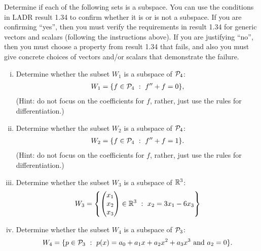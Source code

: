 \begin{question}
    \normalfont

    Determine if each of the following sets is a subspace.  You can use the conditions in LADR result 1.34 to confirm whether it is or is not a subspace.  If you are confirming ``yes'', then you must verify the requirements in result 1.34 for generic vectors and scalars (following the instructions above).  If you are justifying ``no'', then you must choose a property from result 1.34 that fails, and also you must give concrete choices of vectors and/or scalars that demonstrate the failure.


    \begin{enumerate}[(i)]
        \item Determine whether the subset $W_1$ is a subspace of $\P_4$:
              \begin{align*}
                  W_1=\{ f\in \P_4\ : \ f''+f=0 \},
              \end{align*}
              (Hint: do not focus on the coefficients for $f$, rather, just use the rules for differentiation.)

              \vspace{.6cm}

        \item Determine whether the subset $W_2$  is a subspace of $\P_4$:
              \begin{align*}
                  W_2=\{ f\in \P_4\ : \ f''+f=1 \}.
              \end{align*}
              (Hint: do not focus on the coefficients for $f$, rather, just use the rules for differentiation.)

              \vspace{.6cm}


        \item  Determine whether the subset $W_3$ is a subspace of $\real^3$:
              \begin{align*}
                  W_3 = \left\{ \colvecthree{x_1}{x_2}{x_3}\in \real^3 \ :\ x_2 = 3x_1 - 6x_3  \right\}
              \end{align*}

              \vspace{.6cm}

        \item Determine whether the subset $W_4$  is a subspace of $\P_3$:
              \begin{align*}
                  W_4 = \{ p\in\P_3\ : \ p(x) = a_0 + a_1x + a_2 x^2 + a_3x^3\ \text{and}\ a_2=0 \}.
              \end{align*}



\end{enumerate}
\end{question}
